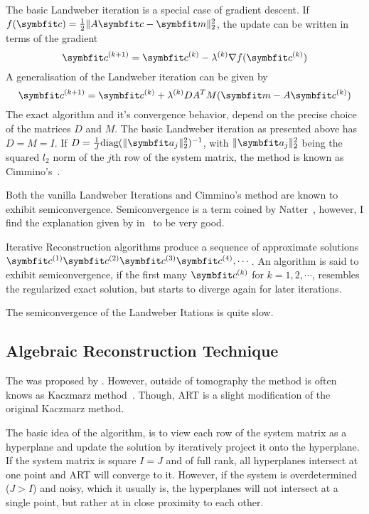 The basic Landweber iteration is a special case of gradient descent. If \(f(\mvec{c}) = \frac{1}{2}
\norm{A\mvec{c} - \mvec{m}}_2^2\), the update can be written in terms of the gradient
\[
	\mvec{c}^{(k+1)} = \mvec{c}^{(k)} - \lambda^{(k)} \nabla f(\mvec{c}^{(k)})
\]
A generalisation of the Landweber iteration can be given by
\[
	\mvec{c}^{(k+1)} = \mvec{c}^{(k)} + \lambda^{(k)} DA^TM(\mvec{m} - A\mvec{c}^{(k)})
\]
The exact algorithm and it's convergence behavior, depend on the precise choice of the matrices
\(D\) and \(M\). The basic Landweber iteration as presented above has \(D = M = I\). If \(D =
\frac{1}{J} \text{diag}(\norm{\mvec{a}_j}^2_2)^{-1}\), with \(\norm{\mvec{a}_j}^2_2\) being the
squared \(l_2\) norm of the \(j\)th row of the system matrix, the method is known as
Cimmino's~\cite[Chapter~6.1]{hansen_discrete_2010}.

Both the vanilla Landweber Iterations and Cimmino's method are known to exhibit semiconvergence.
Semiconvergence is a term coined by Natter~\cite{natterer_mathematics_1986}, however, I find the
explanation given by \citeauthor*{hansen_discrete_2010} in~\cite[Chapter~6]{hansen_discrete_2010}
to be very good.

\begin{definition}[Semiconvergence]\label{def:semiconvergence}
	Iterative Reconstruction algorithms produce a sequence of approximate solutions
	\(\mvec{c}^{(1)} \mvec{c}^{(2)}\mvec{c}^{(3)}\mvec{c}^{(4)}, \cdots\). An algorithm is said
	to exhibit semiconvergence, if the first many \(\mvec{c}^{(k)}\) for \(k = 1, 2, \cdots\),
	resembles the regularized exact solution, but starts to diverge again for later iterations.
\end{definition}

The semiconvergence of the Landweber Itations is quite slow.

\subsection{Algebraic Reconstruction Technique}\label{subsec:algebraic_reconstruction_technique}

The  was proposed by \citeauthor{gordon_algebraic_1970}\cite{gordon_algebraic_1970}.
However, outside of tomography the method is often knows as Kaczmarz
method~\cite{kaczmarz_approximate_1993}. Though, \gls{ART} is a slight modification of the original
Kaczmarz method.

The basic idea of the algorithm, is to view each row of the system matrix as a hyperplane and update
the solution by iteratively project it onto the hyperplane. If the system matrix is square \(I = J\)
and of full rank, all hyperplanes intersect at one point and \gls{ART} will converge to it. However, if
the system is overdetermined (\(J > I\)) and noisy, which it usually is, the hyperplanes will not
intersect at a single point, but rather at in close proximity to each other.

